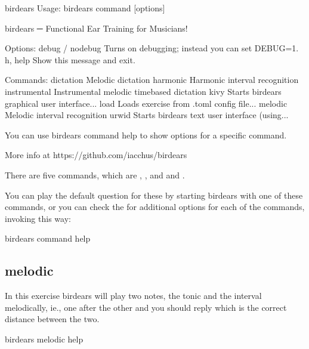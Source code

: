 \documentclass[letterpaper,10pt,english]{sphinxmanual}
\begin{document}
\begin{sphinxVerbatim}[commandchars=\\\{\}]
\PYGZdl{} birdears
Usage: birdears  \PYGZlt{}command\PYGZgt{} [options]

birdears ─ Functional Ear Training for Musicians!

Options:
  \PYGZhy{}\PYGZhy{}debug / \PYGZhy{}\PYGZhy{}no\PYGZhy{}debug  Turns on debugging; instead you can set DEBUG=1.
  \PYGZhy{}h, \PYGZhy{}\PYGZhy{}help            Show this message and exit.

Commands:
  dictation     Melodic dictation
  harmonic      Harmonic interval recognition
  instrumental  Instrumental melodic time\PYGZhy{}based dictation
  kivy          Starts birdears graphical user interface...
  load          Loads exercise from .toml config file...
  melodic       Melodic interval recognition
  urwid         Starts birdears text user interface (using...

  You can use \PYGZsq{}birdears \PYGZlt{}command\PYGZgt{} \PYGZhy{}\PYGZhy{}help\PYGZsq{} to show options for a specific
  command.

  More info at https://github.com/iacchus/birdears
\end{sphinxVerbatim}

There are five commands, which are , ,  and
 and .

You can play the default question for these by starting birdears with one of
these commands, or you can check the  for additional options for each
of the commands, invoking this way:

\begin{sphinxVerbatim}[commandchars=\\\{\}]
birdears \PYGZlt{}command\PYGZgt{} \PYGZhy{}\PYGZhy{}help
\end{sphinxVerbatim}


\subsection{melodic}
\label{\detokenize{index:melodic}}
In this exercise birdears will play two notes, the tonic and the interval
melodically, ie., one after the other and you should reply which is the
correct distance between the two.

\begin{sphinxVerbatim}[commandchars=\\\{\}]
birdears melodic \PYGZhy{}\PYGZhy{}help
\end{sphinxVerbatim}
\end{document}
